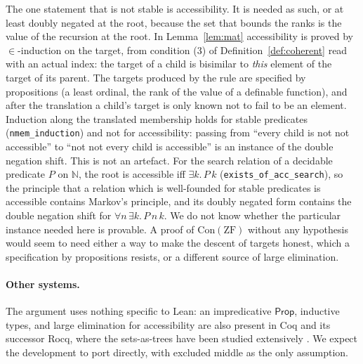 \documentclass[10pt]{article}
\theoremstyle{definition}
\theoremstyle{remark}
\newcommand{\N}{\mathbb{N}}
\newcommand{\Prop}{\mathsf{Prop}}
\newcommand{\ZF}{\mathrm{ZF}}
\newcommand{\Con}{\mathrm{Con}}
\newcommand{\lean}[1]{\texttt{#1}}
\begin{document}
The one statement that is not stable is accessibility. It is needed as
such, or at least doubly negated at the root, because the set that
bounds the ranks is the value of the recursion at the root. In
Lemma~\ref{lem:mat} accessibility is proved by $\in$-induction on the
target, from condition (3) of Definition~\ref{def:coherent} read with an
actual index: the target of a child is bisimilar to \emph{this} element
of the target of its parent. The targets produced by the rule are
specified by propositions (a least ordinal, the rank of the value of a
definable function), and after the translation a child's target is only
known not to fail to be an element. Induction along the translated
membership holds for stable predicates (\lean{nmem\_induction}) and not
for accessibility: passing from ``every child is not not accessible'' to
``not not every child is accessible'' is an instance of the double
negation shift. This is not an artefact. For the search relation of a
decidable predicate $P$ on $\N$, the root is accessible iff $\exists k.\,P\,k$
(\lean{exists\_of\_acc\_search}), so the principle that a relation which
is well-founded for stable predicates is accessible contains Markov's
principle, and its doubly negated form contains the double negation
shift for $\forall n\,\exists k.\,P\,n\,k$. We do not know whether the particular
instance needed here is provable. A proof of $\Con(\ZF)$ without any
hypothesis would seem to need either a way to make the descent of
targets honest, which a specification by propositions resists, or a
different source of large elimination.

\paragraph{Other systems.}
The argument uses nothing specific to Lean: an impredicative $\Prop$,
inductive types, and large elimination for accessibility are also
present in Coq and its successor Rocq, where the sets-as-trees have been
studied extensively \cite{werner97,barras10}. We expect the development
to port directly, with excluded middle as the only assumption.



\end{document}

